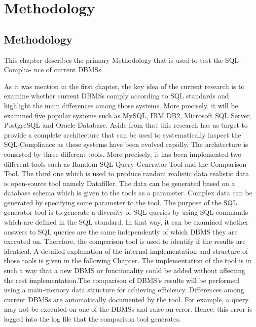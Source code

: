 \chapter{Methodology}

\section{Methodology}
 
This chapter describes the primary Methodology that is used to test the SQL-Complia- nce of current DBMSs. 

As it was mention in the first chapter, the key idea of the current research is to examine whether current DBMSs comply according to SQL standards and highlight the main differences among those systems. More precisely, it will be examined five popular systems such as MySQL, IBM DB2, Microsoft SQL Server, PostgreSQL and Oracle Database. Aside from that this research has as target  to provide a complete architecture that can be used to systematically inspect the SQL-Compliance as these systems have been evolved rapidly. The architecture is consisted by three different tools. More precisely, it has been implemented two different tools such as Random SQL Query Generator Tool and the Comparison Tool. The third one which is used to produce random realistic data realistic data is open-source tool namely Datafiller. The data can be generated based on a database schema which is given to the tools as a parameter. Complex data can be generated by specifying some parameter to the tool.  The purpose of the SQL generator tool is to generate a diversity of SQL queries by using SQL commands which are defined in the SQL standard. In that way, it can be examined whether answers to SQL queries are the same independently of which DBMS they are executed on. Therefore, the comparison tool is used to identify if the results are identical. A detailed explanation of the internal implementation and structure of those tools is given in the following Chapter. The implementation of the tool is in such a way that a new DBMS or functionality could be added without affecting the rest implementation.The comparison of DBMS’s results will be performed using a main-memory data structure for achieving efficiency. Differences among current DBMSs are automatically documented by the tool. For example, a query may not be executed on one of the DBMSs and raise an error. Hence, this error is logged into the log file that the comparison tool generates. 








 